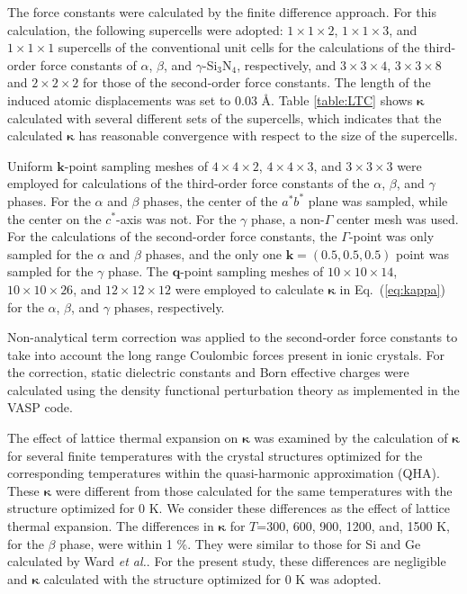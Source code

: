 \documentclass[twocolumn,amsmath,amssymb,a4paper,prb,superscriptaddress,floatfix]{revtex4-1}
\begin{document}
The force constants were calculated by the finite difference
approach\cite{wei-supercell}. For this calculation, the following supercells
were adopted: $1\times 1\times2$, $1\times 1\times3$, and $1\times 1\times1$
supercells of the conventional unit cells for the calculations of the
third-order force constants of $\alpha$, $\beta$, and $\gamma$-Si$_3$N$_4$,
respectively, and $3\times 3\times4$, $3\times 3\times8$ and $2\times 2\times2$
for those of the second-order force constants.  The length of the induced atomic
displacements was set to 0.03 \AA.  Table \ref{table:LTC} shows
$\boldsymbol{\kappa}$ calculated with several different sets of the supercells,
which indicates that the calculated $\boldsymbol{\kappa}$ has reasonable
convergence with respect to the size of the supercells.

Uniform $\mathbf{k}$-point sampling meshes of $4\times 4\times 2$, $4\times
4\times 3$, and $3\times 3\times 3$ were employed for calculations of the
third-order force constants of the $\alpha$, $\beta$, and $\gamma$ phases. For
the $\alpha$ and $\beta$ phases, the center of the $a^*b^*$ plane was sampled,
while the center on the $c^*$-axis was not. For the $\gamma$ phase, a non-$\Gamma$
center mesh was used. For the calculations of the second-order force constants,
the $\Gamma$-point was only sampled for the $\alpha$ and $\beta$
phases, and the
only one $\mathbf{k}=(0.5, 0.5, 0.5)$ point was sampled for the $\gamma$ phase.
The $\mathbf{q}$-point sampling meshes of $10\times 10\times 14$, $10\times
10\times 26$, and $12\times 12\times 12$ were employed to calculate
$\boldsymbol{\kappa}$ in Eq.~(\ref{eq:kappa}) for the $\alpha$, $\beta$, and
$\gamma$ phases, respectively.

Non-analytical term correction\cite{wang} was applied to the second-order force
constants to take into account the long range Coulombic forces present in ionic
crystals. For the correction, static dielectric constants and Born effective
charges were calculated using the density functional perturbation theory
as implemented in the VASP code\cite{vasp-lepsiron,lepsiron}.

The effect of lattice thermal expansion on $\boldsymbol{\kappa}$ was examined
by the calculation of $\boldsymbol{\kappa}$ for several finite
temperatures with the crystal structures optimized for the
corresponding temperatures within the quasi-harmonic approximation
(QHA)\cite{dove-p76}. These $\boldsymbol{\kappa}$ were different from those
calculated for the same temperatures with the structure
optimized for 0 K. We consider these differences as the effect of lattice
thermal expansion. The differences in $\boldsymbol{\kappa}$ for $T$=300, 600,
900, 1200, and, 1500 K, for the $\beta$ phase, were within 1 \%. They
were similar to those for Si and Ge calculated by Ward {\it{et
al.}}\cite{ward-ltc}.
For the present study, these differences are negligible and
$\boldsymbol{\kappa}$ calculated with the
structure optimized for 0 K was adopted.
\end{document}
